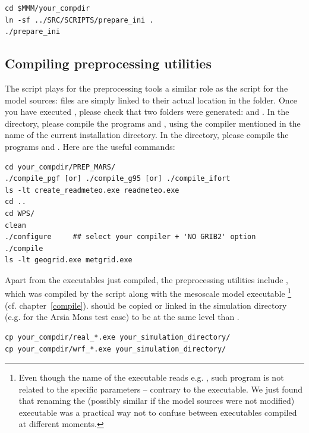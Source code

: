 \begin{verbatim}
cd $MMM/your_compdir
ln -sf ../SRC/SCRIPTS/prepare_ini .
./prepare_ini
\end{verbatim}

\sk
\subsection{Compiling preprocessing utilities}

\sk
The script  plays for the preprocessing tools a similar role as the script  for the model sources: files are simply linked to their actual location in the  folder. Once you have executed , please check that two folders were generated:  and . In the  directory, please compile the programs  and , using the compiler mentioned in the name of the current installation directory. In the  directory, please compile the programs  and . Here are the useful commands:

\begin{verbatim}
cd your_compdir/PREP_MARS/
./compile_pgf [or] ./compile_g95 [or] ./compile_ifort  
ls -lt create_readmeteo.exe readmeteo.exe
cd ..
cd WPS/
clean
./configure     ## select your compiler + 'NO GRIB2' option
./compile
ls -lt geogrid.exe metgrid.exe
\end{verbatim}

\sk
Apart from the executables just compiled, the preprocessing utilities include , which was compiled by the  script along with the mesoscale model executable \footnote{Even though the name of the executable reads e.g. , such program is not related to the specific  parameters -- contrary to the  executable. We just found that renaming the (possibly similar if the model sources were not modified)  executable was a practical way not to confuse between executables compiled at different moments.} (cf. chapter~\ref{compile}).  should be copied or linked in the simulation directory (e.g.  for the Arsia Mons test case) to be at the same level than .

\begin{verbatim}
cp your_compdir/real_*.exe your_simulation_directory/
cp your_compdir/wrf_*.exe your_simulation_directory/
\end{verbatim}

